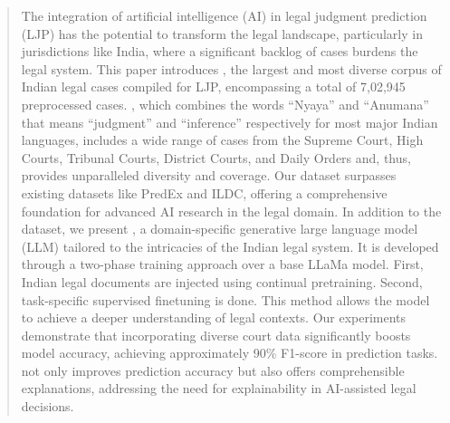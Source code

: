 \begin{abstract}
The integration of artificial intelligence (AI) in legal judgment prediction (LJP) has the potential to transform the legal landscape, particularly in jurisdictions like India, where a significant backlog of cases burdens the legal system. This paper introduces \texttt{\named}, the largest and most diverse corpus of Indian legal cases compiled for LJP, encompassing a total of 7,02,945 preprocessed cases. \texttt{\named}, which combines the words ``Nyaya'' and ``Anumana'' that means ``judgment'' and ``inference'' respectively for most major Indian languages, includes a wide range of cases from the Supreme Court, High Courts, Tribunal Courts, District Courts, and Daily Orders and, thus, provides unparalleled diversity and coverage. Our dataset surpasses existing datasets like PredEx and ILDC, offering a comprehensive foundation for advanced AI research in the legal domain.
% 
In addition to the dataset, we present \texttt{\namel}, a domain-specific generative large language model (LLM) tailored to the intricacies of the Indian legal system. It is developed through a two-phase training approach over a base LLaMa model. First, Indian legal documents are injected using continual pretraining. Second, task-specific supervised finetuning is done. This method allows the model to achieve a deeper understanding of legal contexts.
%
Our experiments demonstrate that incorporating diverse court data significantly boosts model accuracy, achieving approximately 90\% F1-score in prediction tasks. \texttt{\namel} not only improves prediction accuracy but also offers comprehensible explanations, addressing the need for explainability in AI-assisted legal decisions. 


\end{abstract}
